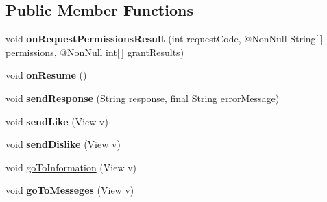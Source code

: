 \subsection*{Public Member Functions}
\begin{DoxyCompactItemize}
\item 
void {\bfseries on\+Request\+Permissions\+Result} (int request\+Code, @Non\+Null String\mbox{[}$\,$\mbox{]} permissions, @Non\+Null int\mbox{[}$\,$\mbox{]} grant\+Results)\hypertarget{classcom_1_1example_1_1sebastian_1_1tindertp_1_1MatchingActivity_a206e6cec7bb1a84e4e30592c5409b74d}{}\label{classcom_1_1example_1_1sebastian_1_1tindertp_1_1MatchingActivity_a206e6cec7bb1a84e4e30592c5409b74d}

\item 
void {\bfseries on\+Resume} ()\hypertarget{classcom_1_1example_1_1sebastian_1_1tindertp_1_1MatchingActivity_a0333dc89868b7e867c1df75ec9d7717f}{}\label{classcom_1_1example_1_1sebastian_1_1tindertp_1_1MatchingActivity_a0333dc89868b7e867c1df75ec9d7717f}

\item 
void {\bfseries send\+Response} (String response, final String error\+Message)\hypertarget{classcom_1_1example_1_1sebastian_1_1tindertp_1_1MatchingActivity_a074e2aa018a3f0c747b2847ea8148b1b}{}\label{classcom_1_1example_1_1sebastian_1_1tindertp_1_1MatchingActivity_a074e2aa018a3f0c747b2847ea8148b1b}

\item 
void {\bfseries send\+Like} (View v)\hypertarget{classcom_1_1example_1_1sebastian_1_1tindertp_1_1MatchingActivity_aaac2d32f3fa7f049c705f3ab41dce15f}{}\label{classcom_1_1example_1_1sebastian_1_1tindertp_1_1MatchingActivity_aaac2d32f3fa7f049c705f3ab41dce15f}

\item 
void {\bfseries send\+Dislike} (View v)\hypertarget{classcom_1_1example_1_1sebastian_1_1tindertp_1_1MatchingActivity_ab767385c590b24f38a900a8d3e654ba5}{}\label{classcom_1_1example_1_1sebastian_1_1tindertp_1_1MatchingActivity_ab767385c590b24f38a900a8d3e654ba5}

\item 
void \hyperlink{classcom_1_1example_1_1sebastian_1_1tindertp_1_1MatchingActivity_a92e5feb9b14200be7e31f5069c305946}{go\+To\+Information} (View v)
\item 
void {\bfseries go\+To\+Messeges} (View v)\hypertarget{classcom_1_1example_1_1sebastian_1_1tindertp_1_1MatchingActivity_a3fb08eda023bf9fe146209008d556d26}{}\label{classcom_1_1example_1_1sebastian_1_1tindertp_1_1MatchingActivity_a3fb08eda023bf9fe146209008d556d26}


\end{DoxyCompactItemize}
